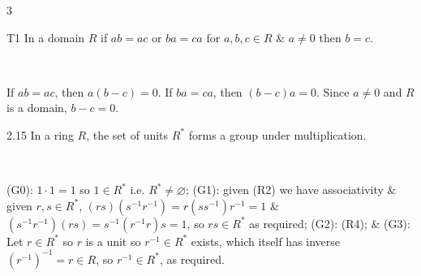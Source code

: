 \documentclass[8pt]{extarticle}
\makeatletter
\renewenvironment{proof}[1][\proofname]{%
  \begin{tcolorbox}[proofpairboxstyle]%
  \pushQED{\qed}%
  \normalfont\itshape #1\@addpunct{.}\ \normalfont\ignorespaces
}{%
  \popQED%
  \end{tcolorbox}%
}
\makeatother
\begin{document}
\begin{multicols*}{3}
        \begin{proposition}{T1}
            In a domain \(R\) if \(ab=ac\) or \(ba=ca\) for \(a,b,c\in R\) \& \(a\ne0\) then \(b=c\).
        \end{proposition}

        \begin{proof}
            If \(ab=ac\), then \(a(b-c)=0\). If \(ba=ca\), then \((b-c)a=0\). Since \(a\ne0\) and \(R\) is a domain, \(b-c=0\).        
        \end{proof}

        \begin{lemma}{2.15}
            In a ring \(R\), the set of units \(R^*\) forms a group under multiplication.
        \end{lemma}

        \begin{proof}
            (G0): \(1\cdot1=1\) so \(1\in R^*\) i.e. \(R^*\ne\varnothing\); (G1): given (R2) we have associativity \& given \(r,s\in R^*\), \((rs)(s^{-1}r^{-1})=r(ss^{-1})r^{-1}=1\) \&
            \((s^{-1}r^{-1})(rs)=s^{-1}(r^{-1}r)s=1\), so \(rs\in R^*\) as required; (G2): (R4); \& (G3): Let \(r\in R^*\) so \(r\) is a unit so \(r^{-1}\in R^*\) exists, which itself has inverse \((r^{-1})^{-1}=r\in R\), so \(r^{-1}\in R^*\), as required.

        \end{proof}

        \vspace{-2pt}
        \noindent{}
\end{multicols*}
\end{document}
